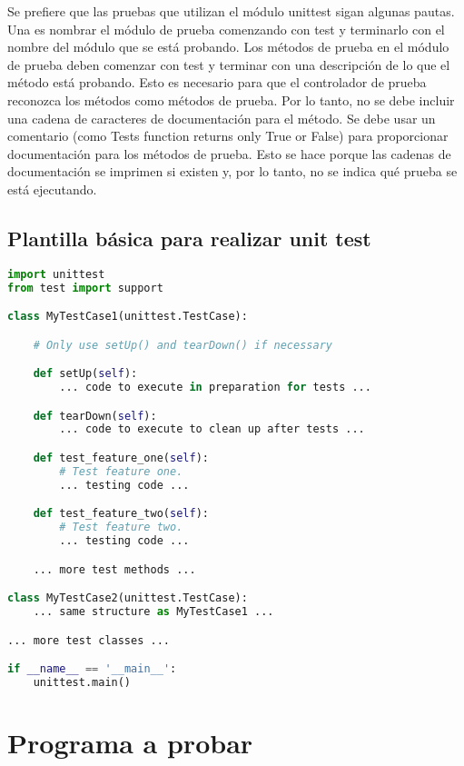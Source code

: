 \documentclass[conference]{IEEEtran}
\begin{document}
Se prefiere que las pruebas que utilizan el módulo unittest sigan algunas pautas. Una es nombrar el módulo de prueba comenzando con test y terminarlo con el nombre del módulo que se está probando. Los métodos de prueba en el módulo de prueba deben comenzar con test y terminar con una descripción de lo que el método está probando. Esto es necesario para que el controlador de prueba reconozca los métodos como métodos de prueba. Por lo tanto, no se debe incluir una cadena de caracteres de documentación para el método. Se debe usar un comentario (como Tests function returns only True or False) para proporcionar documentación para los métodos de prueba. Esto se hace porque las cadenas de documentación se imprimen si existen y, por lo tanto, no se indica qué prueba se está ejecutando.

\subsection{Plantilla básica para realizar unit test}

\begin{lstlisting}[language=Python,basicstyle=\scriptsize, breaklines=true,
    postbreak=\mbox{\textcolor{red}{$\hookrightarrow$}\space}]
import unittest
from test import support

class MyTestCase1(unittest.TestCase):

    # Only use setUp() and tearDown() if necessary

    def setUp(self):
        ... code to execute in preparation for tests ...

    def tearDown(self):
        ... code to execute to clean up after tests ...

    def test_feature_one(self):
        # Test feature one.
        ... testing code ...

    def test_feature_two(self):
        # Test feature two.
        ... testing code ...

    ... more test methods ...

class MyTestCase2(unittest.TestCase):
    ... same structure as MyTestCase1 ...

... more test classes ...

if __name__ == '__main__':
    unittest.main()

\end{lstlisting}


\section{Programa a probar}
\end{document}
